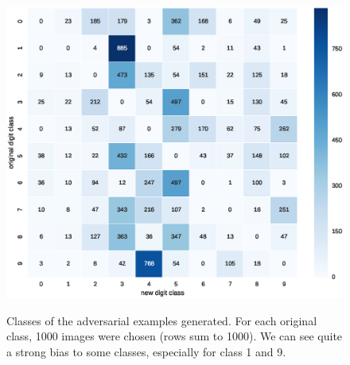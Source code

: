 \documentclass{article} %
\begin{document}
\begin{figure}[h!]
\begin{center}
\includegraphics[scale=0.6]{figs/sup_3}
\label{exp:sup_3}
\caption{\small Classes of the adversarial examples generated.
For each original class, 1000 images were chosen (rows sum to 1000). We can see quite a strong bias to some classes, especially for class 1 and 9.}
\end{center}
\end{figure}

\null
\vfill
\newpage
\end{document}
